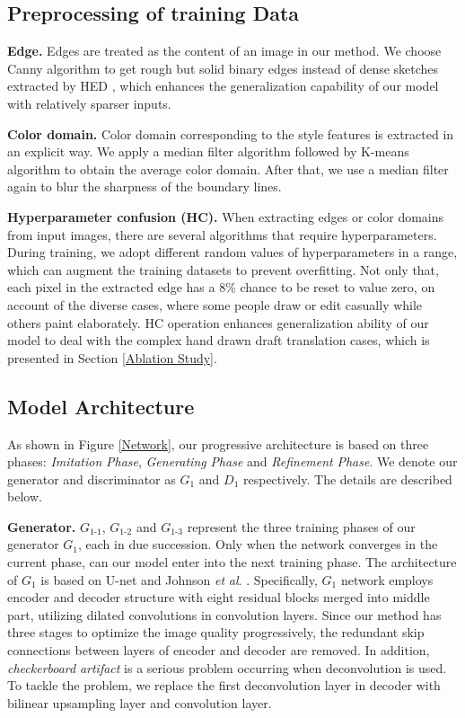 \documentclass[10pt,twocolumn,letterpaper]{article} \usepackage{amsfonts,amssymb}
\begin{document}
\subsection{Preprocessing of training Data} \label{Preprocessing of training Data}

{\bf Edge.}
Edges are treated as the content of an image in our method. We choose Canny algorithm \cite{canny1987computational} to get rough but solid binary edges instead of dense sketches extracted by HED \cite{xie2015holistically}, which enhances the generalization capability of our model with relatively sparser inputs.

{\bf Color domain.}
Color domain corresponding to the style features is extracted in an explicit way. We apply a median filter algorithm followed by K-means \cite{coates2012learning} algorithm to obtain the average color domain.  After that, we use a median filter again to blur the sharpness of the boundary lines.

{\bf Hyperparameter confusion (HC).}
When extracting edges or color domains from input images, there are several algorithms that require hyperparameters. During training, we adopt different random values of hyperparameters in a range, which can augment the training datasets to prevent overfitting. Not only that, each pixel in the extracted edge has a 8\% chance to be reset to value zero, on account of the diverse cases, where some people draw or edit casually while others paint elaborately. HC operation enhances generalization ability of our model to deal with the complex hand drawn draft translation cases, which is presented in Section \ref{Ablation Study}.

\subsection{Model Architecture} \label{Model Architecture}
As shown in Figure \ref{Network}, our progressive architecture is based on three phases: \emph{Imitation} \emph{Phase}, \emph{Generating} \emph{Phase} and \emph{Refinement} \emph{Phase}. We denote our generator and discriminator as $G_1$ and $D_1$ respectively. The details are described below.

{\bf Generator.}
$G_{1\text{-}1}$, $G_{1\text{-}2}$ and $G_{1\text{-}3}$ represent the three training phases of our generator $G_1$, each in due succession. Only when the network converges in the current phase, can our model enter into the next training phase. The architecture of $G_1$ is based on U-net \cite{ronneberger2015u} and  Johnson \emph{et} \emph{al}. \cite{johnson2016perceptual}. Specifically, $G_1$ network employs encoder and decoder structure with eight residual blocks \cite{he2016deep} merged into middle part, utilizing dilated convolutions in convolution layers. Since our method has three stages to optimize the image quality progressively, the redundant skip connections between layers of encoder and decoder are removed. In addition, \emph{checkerboard} \emph{artifact} is a serious problem \cite{odena2016deconvolution} occurring when deconvolution is used. To tackle the problem, we replace the first deconvolution layer in decoder with bilinear upsampling layer and convolution layer.
\end{document}
